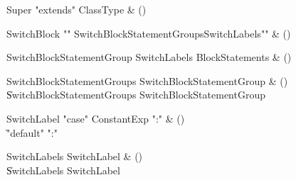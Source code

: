 \begin{bbgrammar}

Super \label{prod:Super}  \: \xcd"extends" ClassType & () \\


\end{bbgrammar}

\begin{bbgrammar}

SwitchBlock \label{prod:SwitchBlock}  \: \xcd"{" SwitchBlockStatementGroups\opt SwitchLabels\opt \xcd"}" & () \\


\end{bbgrammar}

\begin{bbgrammar}

SwitchBlockStatementGroup \label{prod:SwitchBlockStatementGroup}  \: SwitchLabels BlockStatements & () \\


\end{bbgrammar}

\begin{bbgrammar}

SwitchBlockStatementGroups \label{prod:SwitchBlockStatementGroups}  \: SwitchBlockStatementGroup & () \\

    \| SwitchBlockStatementGroups SwitchBlockStatementGroup \\

\end{bbgrammar}

\begin{bbgrammar}

SwitchLabel \label{prod:SwitchLabel}  \: \xcd"case" ConstantExp \xcd":" & () \\

    \| \xcd"default" \xcd":" \\

\end{bbgrammar}

\begin{bbgrammar}

SwitchLabels \label{prod:SwitchLabels}  \: SwitchLabel & () \\

    \| SwitchLabels SwitchLabel \\

\end{bbgrammar}

